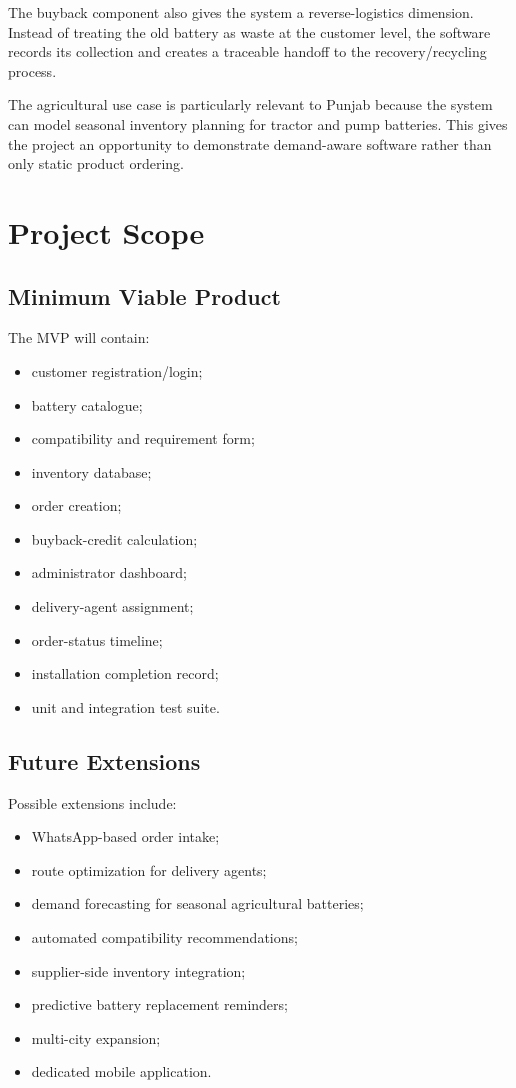 \documentclass[11pt,a4paper]{article}
\begin{document}
The buyback component also gives the system a reverse-logistics dimension.
Instead of treating the old battery as waste at the customer level, the
software records its collection and creates a traceable handoff to the
recovery/recycling process.

The agricultural use case is particularly relevant to Punjab because the
system can model seasonal inventory planning for tractor and pump batteries.
This gives the project an opportunity to demonstrate demand-aware software
rather than only static product ordering.

\section{Project Scope}

\subsection{Minimum Viable Product}

The MVP will contain:

\begin{itemize}[leftmargin=0.7cm]
    \item customer registration/login;
    \item battery catalogue;
    \item compatibility and requirement form;
    \item inventory database;
    \item order creation;
    \item buyback-credit calculation;
    \item administrator dashboard;
    \item delivery-agent assignment;
    \item order-status timeline;
    \item installation completion record;
    \item unit and integration test suite.
\end{itemize}

\subsection{Future Extensions}

Possible extensions include:

\begin{itemize}[leftmargin=0.7cm]
    \item WhatsApp-based order intake;
    \item route optimization for delivery agents;
    \item demand forecasting for seasonal agricultural batteries;
    \item automated compatibility recommendations;
    \item supplier-side inventory integration;
    \item predictive battery replacement reminders;
    \item multi-city expansion;
    \item dedicated mobile application.
\end{itemize}
\end{document}
